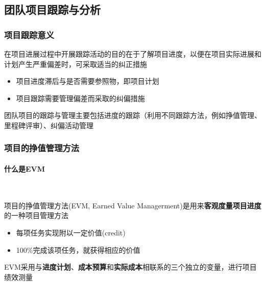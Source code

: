 \subsection{团队项目跟踪与分析}
\subsubsection{项目跟踪意义}
在项目进展过程中开展跟踪活动的目的在于了解项目进度，以便在项目实际进展和计划产生严重偏差时，可采取适当的纠正措施
\vspace{-0.8em}
\begin{multicols}{2}
    \begin{itemize}
        \item 项目进度滞后与是否需要参照物，即项目计划
        \item 项目跟踪需要管理偏差而采取的纠偏措施
    \end{itemize}
\end{multicols}
\vspace{-1em}

团队项目的跟踪与管理主要包括进度的跟踪（利用不同跟踪方法，例如挣值管理、里程碑评审）、纠偏活动管理

\subsubsection{项目的挣值管理方法}
\paragraph{什么是EVM}~{} \par
项目的挣值管理方法(EVM, Earned Value Managerment)是用来\textbf{客观度量项目进度}的一种项目管理方法
\vspace{-2.2em}
\begin{multicols}{2}
    \begin{itemize}
        \item 每项任务实现附以一定价值(credit)
        \item 100\%完成该项任务，就获得相应的价值
    \end{itemize}
\end{multicols}
\vspace{-1em}

EVM采用与\textbf{进度计划}、\textbf{成本预算}和\textbf{实际成本}相联系的三个独立的变量，进行项目绩效测量

